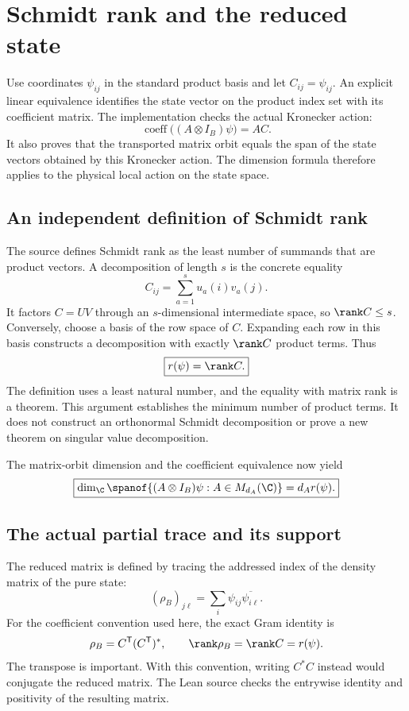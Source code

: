 \section{Schmidt rank and the reduced state}\label{supp3:section:002}
Use coordinates $\psi_{ij}$ in the standard product basis and let $C_{ij}=\psi_{ij}$. An explicit linear equivalence identifies the state vector on the product index set with its coefficient matrix. The implementation checks the actual Kronecker action:
\[
\operatorname{coeff}\bigl((A\otimes I_B)\psi\bigr)=AC.
\]
It also proves that the transported matrix orbit equals the span of the state vectors obtained by this Kronecker action. The dimension formula therefore applies to the physical local action on the state space.

\subsection{An independent definition of Schmidt rank}
The source defines Schmidt rank as the least number of summands that are product vectors. A decomposition of length $s$ is the concrete equality
\[
C_{ij}=\sum_{a=1}^{s}u_a(i)v_a(j).
\]
It factors $C=UV$ through an $s$-dimensional intermediate space, so $\rank C\le s$. Conversely, choose a basis of the row space of $C$. Expanding each row in this basis constructs a decomposition with exactly $\rank C$ product terms. Thus
\[
\boxed{r(\psi)=\rank C.}
\]
The definition uses a least natural number, and the equality with matrix rank is a theorem. This argument establishes the minimum number of product terms. It does not construct an orthonormal Schmidt decomposition or prove a new theorem on singular value decomposition.

The matrix-orbit dimension and the coefficient equivalence now yield
\[
\boxed{\dim_\C\spanof\{(A\otimes I_B)\psi:A\in M_{d_A}(\C)\}
=d_A r(\psi).}
\]

\subsection{The actual partial trace and its support}
The reduced matrix is defined by tracing the addressed index of the density matrix of the pure state:
\[
(\rho_B)_{j\ell}=\sum_i\psi_{ij}\overline{\psi_{i\ell}}.
\]
For the coefficient convention used here, the exact Gram identity is
\[
\rho_B=C^{\mathsf T}(C^{\mathsf T})^*,
\qquad \rank\rho_B=\rank C=r(\psi).
\]
The transpose is important. With this convention, writing $C^*C$ instead would conjugate the reduced matrix. The Lean source checks the entrywise identity and positivity of the resulting matrix.

